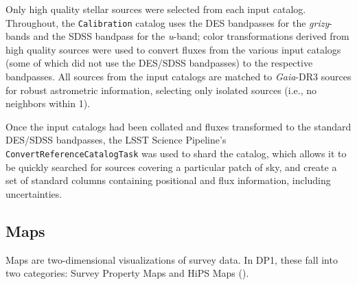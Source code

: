 \begin{itemize}
Only high quality stellar sources were selected from each input catalog. 
Throughout, the \texttt{Calibration} catalog uses the \gls{DES} bandpasses for the \textit{grizy}-bands and the \gls{SDSS} bandpass for the \textit{u}-band; color transformations derived from high quality sources were used to convert fluxes from the various input catalogs (some of which did not use the \gls{DES}/SDSS bandpasses) to the respective bandpasses. 
All sources from the input catalogs are matched to \textit{Gaia}-\gls{DR3} sources for robust astrometric information, selecting only isolated sources (i.e., no neighbors within 1\arcsec).

Once the input catalogs had been collated and fluxes transformed to the standard \gls{DES}/\gls{SDSS} bandpasses, the \gls{LSST} Science Pipeline's \texttt{ConvertReferenceCatalogTask} was used to shard the catalog, which allows it to be quickly searched for sources covering a particular \gls{patch} of sky, and create a set of standard columns containing positional and \gls{flux} information, including uncertainties.


\end{itemize}





\subsection{Maps}
Maps are two-dimensional visualizations of survey data. 
In \gls{DP1}, these fall into two categories: Survey Property Maps and \gls{HiPS} Maps (\citealt{2015A&A...578A.114F}).

